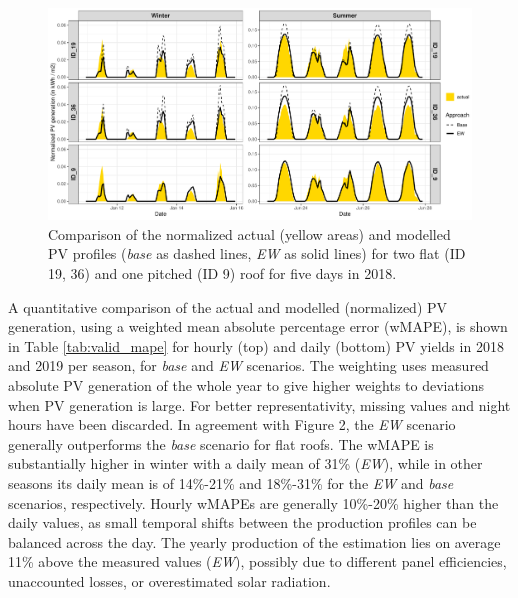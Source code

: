 \begin{figure}[tb]
\centering\includegraphics[width=0.9\linewidth]{images/Figs/CISBAT_profiles.pdf}
\caption{Comparison of the normalized actual (yellow areas) and modelled PV profiles (\textit{base} as dashed lines, \textit{EW} as solid lines) for two flat (ID 19, 36) and one pitched (ID 9) roof for five days in 2018.}
\label{fig:valid_hourly}
\end{figure}

A quantitative comparison of the actual and modelled (normalized) PV generation, using a weighted mean absolute percentage error (wMAPE), is shown in Table \ref{tab:valid_mape} for hourly (top) and daily (bottom) PV yields in 2018 and 2019 per season, for \textit{base} and \textit{EW} scenarios. The weighting uses measured absolute PV generation of the whole year to give higher weights to deviations when PV generation is large. For better representativity, missing values and night hours have been discarded. In agreement with Figure 2, the \textit{EW} scenario generally outperforms the \textit{base} scenario for flat roofs. The wMAPE is substantially higher in winter with a daily mean of 31\% (\textit{EW}), while in other seasons its daily mean is of 14\%-21\% and 18\%-31\% for the \textit{EW} and \textit{base} scenarios, respectively. Hourly wMAPEs are generally 10\%-20\% higher than the daily values, as small temporal shifts between the production profiles can be balanced across the day. The yearly production of the estimation lies on average 11\% above the measured values (\textit{EW}), possibly due to different panel efficiencies, unaccounted losses, or overestimated solar radiation. 

